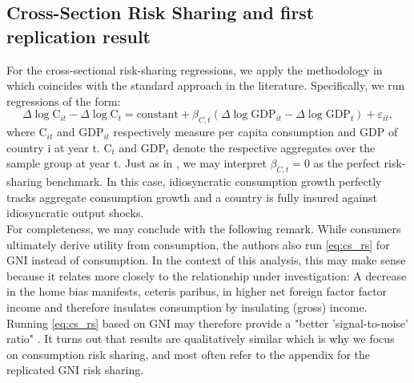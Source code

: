 \documentclass[11pt,a4paper]{article}
\begin{document}
\subsection{Cross-Section Risk Sharing and first replication result}\label{subsec:replication_cs}
\indent For the cross-sectional risk-sharing regressions, we apply the methodology in \textcite[p.593]{main} which coincides with the standard approach in the literature. 
Specifically, we run regressions of the form:
\begin{equation}
    \Delta \log \mathrm{C}_{it}-\Delta \log \mathrm{C}_t = \text{constant} + \beta_{C,t}(\Delta \log \mathrm{GDP}_{it}-\Delta\log \mathrm{GDP}_t) + \varepsilon_{it},
    \label{eq:cs_rs}
\end{equation}
where $\mathrm{C}_{it}$ and $\mathrm{GDP}_{it}$ respectively measure per capita consumption and GDP of country i at year t.
$\mathrm{C}_t$ and $\mathrm{GDP}_t$ denote the respective aggregates over the sample group at year t. Just as in \textcite[p.21]{notes}, we may interpret $\beta_{C,t}=0$ as the perfect risk-sharing benchmark. In this case,
idiosyncratic consumption growth perfectly tracks aggregate consumption growth and a country is fully insured against idiosyncratic output shocks.\\
\indent For completeness, we may conclude with the following remark. While consumers ultimately derive utility from consumption, the authors also run \ref{eq:cs_rs} for GNI instead of consumption. In the context of this analysis, this may make sense because it relates more closely to the relationship under investigation: A decrease in the home bias manifests, ceteris paribus, in higher net foreign factor factor income and therefore insulates consumption by insulating (gross) income. Running \ref{eq:cs_rs} based on GNI may therefore provide a "better 'signal-to-noise' ratio"
\parencite[p. 589]{main}. It turns out that results are qualitatively similar which is why we focus on consumption risk sharing, and most often refer to the appendix for the replicated GNI risk sharing.\\
\end{document}
